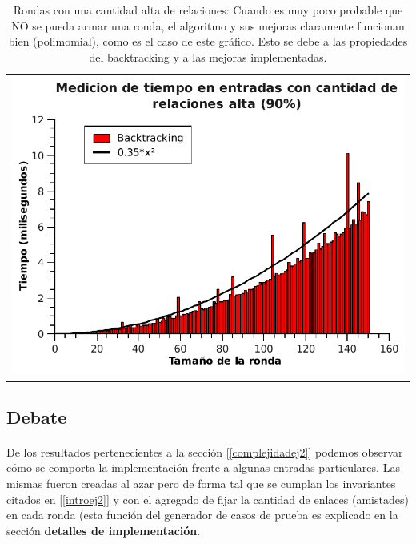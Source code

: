 \begin{table}[ht] %
\centering %
\begin{tabular}{c}
\includegraphics[scale=0.7]{../Ej_2/Otros/Graficos/Graph90.pdf} \\
\end{tabular}

\caption{Rondas con una cantidad alta de relaciones: Cuando es muy poco probable que NO se pueda armar una ronda, el algoritmo y sus mejoras claramente funcionan bien (polimomial), como es el caso de este gráfico. Esto se debe a las propiedades del backtracking y a las mejoras implementadas.} %
\label{tiempoEj2c} %
\end{table}




\subsection{Debate}
\paragraph{}
De los resultados pertenecientes a la sección [\ref{complejidadej2}] podemos observar cómo se comporta la implementación frente a algunas entradas particulares. Las mismas fueron creadas al azar pero de forma tal que se cumplan los invariantes citados en [\ref{introej2}] y con el agregado de fijar la cantidad de enlaces (amistades) en cada ronda (esta función del generador de casos de prueba es explicado en la sección \textbf{detalles de implementación}.


